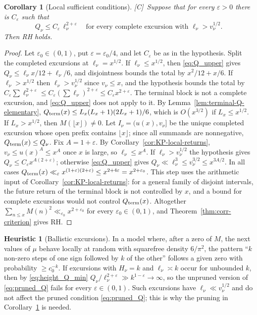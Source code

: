 \documentclass[11pt,reqno]{amsart}
\numberwithin{equation}{section}
\theoremstyle{plain}
\newtheorem{corollary}[theorem]{Corollary}
\theoremstyle{definition}
\newtheorem{heuristic}[theorem]{Heuristic}
\theoremstyle{remark}
\newcommand{\eps}{\varepsilon}
\newcommand{\tagC}{\textup{[C]}}
\begin{document}
\begin{corollary}[Local sufficient conditions]
\label{cor:local-corr-sufficient}
\tagC\ Suppose that for every $\eps>0$ there is $C_\eps$ such that
\begin{equation}
\label{eq:pruned_Q}
  Q_\nu\le C_\eps\,\ell_\nu^{2+\eps}\quad\text{for every complete excursion with }
  \ell_\nu>v_\nu^{1/2}.
\end{equation}
Then RH holds.
\end{corollary}

\begin{proof}
Let $\eps_0\in(0,1)$, put $\eps=\eps_0/4$, and let $C_\eps$ be as in the
hypothesis. Split the completed excursions at $\ell_\nu=x^{1/2}$. If
$\ell_\nu\le x^{1/2}$, then \eqref{eq:Q_upper} gives
$Q_\nu\le\ell_\nu x/12+\ell_\nu/6$, and disjointness bounds the total by
$x^2/12+x/6$. If $\ell_\nu>x^{1/2}$ then $\ell_\nu>v_\nu^{1/2}$ since
$v_\nu\le x$, and the hypothesis bounds the total by
$C_\eps\sum\ell_\nu^{2+\eps}\le C_\eps(\sum\ell_\nu)^{2+\eps}\le C_\eps x^{2+\eps}$.
The terminal block is not a complete excursion, and \eqref{eq:Q_upper} does
not apply to it. By Lemma~\ref{lem:terminal-Q-elementary},
$Q_{\rm term}(x)\le L_x(L_x+1)(2L_x+1)/6$, which is $O(x^{3/2})$ if $L_x\le x^{1/2}$. If $L_x>x^{1/2}$, then $M(\lfloor x\rfloor)\ne0$.  Let
$I_\nu=(u(x),v_\nu]$ be the unique completed excursion whose open prefix
contains $\lfloor x\rfloor$; since all summands are nonnegative,
$Q_{\rm term}(x)\le Q_\nu$. Fix $A=1+\eps$. By
Corollary~\ref{cor:KP-local-returns}, $v_\nu\le u(x)^A\le x^A$ once $x$ is
large, so $\ell_\nu\le x^A$. If $\ell_\nu>v_\nu^{1/2}$ the hypothesis gives
$Q_\nu\le C_\eps x^{A(2+\eps)}$; otherwise \eqref{eq:Q_upper} gives
$Q_\nu\ll\ell_\nu^3\le v_\nu^{3/2}\le x^{3A/2}$. In all cases
$Q_{\rm term}(x)\ll_\eps x^{(1+\eps)(2+\eps)}\le x^{2+4\eps}=x^{2+\eps_0}$. This step uses the arithmetic
input of Corollary~\ref{cor:KP-local-returns}: for a general family of
disjoint intervals, the future return of the terminal block is not
controlled by $x$, and a bound for complete excursions would not control
$Q_{\rm term}(x)$. Altogether
$\sum_{n\le x}M(n)^2\ll_{\eps_0}x^{2+\eps_0}$ for every $\eps_0\in(0,1)$,
and Theorem~\ref{thm:corr-criterion} gives RH.
\end{proof}

\begin{heuristic}[Ballistic excursions]
\label{heu:local_fails}
In a model where, after a zero of $M$, the next values of $\mu$ behave
locally at random with squarefree density $6/\pi^2$, the pattern ``$k$
non-zero steps of one sign followed by $k$ of the other'' follows a given
zero with probability $\ge c_0^{-k}$. If excursions with $H_\nu=k$ and
$\ell_\nu\asymp k$ occur for unbounded $k$, then by \eqref{eq:height_Q_min}
$Q_\nu/\ell_\nu^{2+\eps}\gg k^{1-\eps}\to\infty$, so the unpruned version of
\eqref{eq:pruned_Q} fails for every $\eps\in(0,1)$. Such excursions have
$\ell_\nu\ll v_\nu^{1/2}$ and do not affect the pruned condition
\eqref{eq:pruned_Q}; this is why the pruning in
Corollary~\ref{cor:local-corr-sufficient} is needed.
\end{heuristic}
\end{document}
